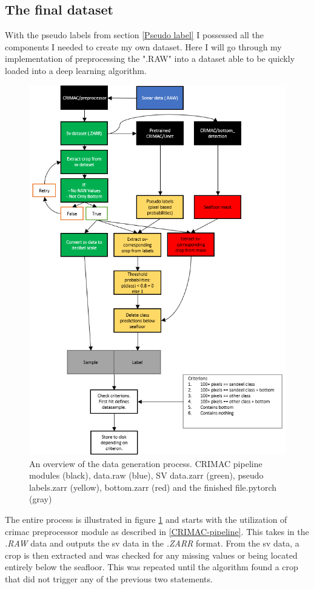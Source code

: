     \subsection{The final dataset}
        With the pseudo labels from section \ref{Pseudo label} I possessed all the components I needed to create my own dataset. Here I will go through my implementation of preprocessing the ".RAW" into a dataset able to be quickly loaded into a deep learning algorithm.
        \clearpage
        \begin{figure}[H]
            \centering
            \includegraphics[scale=0.8]{figures/flow_data_gen.png}
            \caption[Data generation process]{An overview of the data generation process. CRIMAC pipeline modules (black), data.raw (blue), SV data.zarr (green), pseudo labels.zarr (yellow), bottom.zarr (red) and the finished file.pytorch (gray)}
          	\medskip 
            \label{data_generation_flowchart_fig}
        \end{figure}
        The entire process is illustrated in figure \ref{data_generation_flowchart_fig} and starts with the utilization of \gls{crimac} preprocessor module as described in \ref{CRIMAC-pipeline}. This takes in the \textit{.RAW} data and outputs the \gls{sv} data in the \textit{.ZARR} format. From the \gls{sv} data, a crop is then extracted and was checked for any missing values or being located entirely below the seafloor. This was repeated until the algorithm found a crop that did not trigger any of the previous two statements.
        
